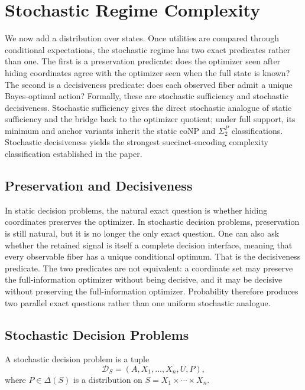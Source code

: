 \section{Stochastic Regime Complexity}\label{sec:stochastic}

We now add a distribution over states. Once utilities are compared through conditional expectations, the stochastic regime has two exact predicates rather than one. The first is a preservation predicate: does the optimizer seen after hiding coordinates agree with the optimizer seen when the full state is known? The second is a decisiveness predicate: does each observed fiber admit a unique Bayes-optimal action? Formally, these are stochastic sufficiency and stochastic decisiveness. Stochastic sufficiency gives the direct stochastic analogue of static sufficiency and the bridge back to the optimizer quotient; under full support, its minimum and anchor variants inherit the static coNP and $\Sigma_2^P$ classifications. Stochastic decisiveness yields the strongest succinct-encoding complexity classification established in the paper.

\subsection{Preservation and Decisiveness}

In static decision problems, the natural exact question is whether hiding coordinates preserves the optimizer. In stochastic decision problems, preservation is still natural, but it is no longer the only exact question. One can also ask whether the retained signal is itself a complete decision interface, meaning that every observable fiber has a unique conditional optimum. That is the decisiveness predicate. The two predicates are not equivalent: a coordinate set may preserve the full-information optimizer without being decisive, and it may be decisive without preserving the full-information optimizer. Probability therefore produces two parallel exact questions rather than one uniform stochastic analogue.

\subsection{Stochastic Decision Problems}

\begin{definition}\label{def:stochastic-decision-problem}
A stochastic decision problem is a tuple
\[
\mathcal{D}_S=(A,X_1,\ldots,X_n,U,P),
\]
where $P\in\Delta(S)$ is a distribution on $S=X_1\times\cdots\times X_n$.
\end{definition}

